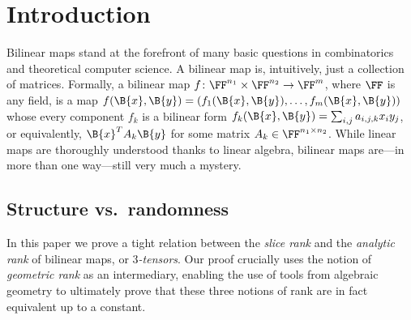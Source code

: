 \section{Introduction}
%

%
%

Bilinear maps stand at the forefront of many basic questions in combinatorics and theoretical computer science. 
A bilinear map is, intuitively, just a collection of matrices. 
Formally, a bilinear map $f \colon \FF^{n_1} \times \FF^{n_2} \to \FF^m$, where $\FF$ is any field, is a map $f(\B{x},\B{y})=(f_1(\B{x},\B{y}),\ldots,f_m(\B{x},\B{y}))$ whose every component $f_k$ is a bilinear form $f_k(\B{x},\B{y}) = \sum_{i,j} a_{i,j,k}x_iy_j$, or equivalently, $\B{x}^T A_k \B{y}$ for some matrix $A_k \in \FF^{n_1 \times n_2}$.
While linear maps are thoroughly understood thanks to linear algebra, 
bilinear maps are---in more than one way---still very much a mystery.



\subsection{Structure vs.\ randomness}

In this paper we prove a tight relation between the \emph{slice rank} and the \emph{analytic rank} of bilinear maps, or \emph{$3$-tensors}.
Our proof crucially uses the notion of \emph{geometric rank} as an intermediary, enabling the use of tools from algebraic geometry to ultimately prove that these three notions of rank are in fact equivalent up to a constant.



